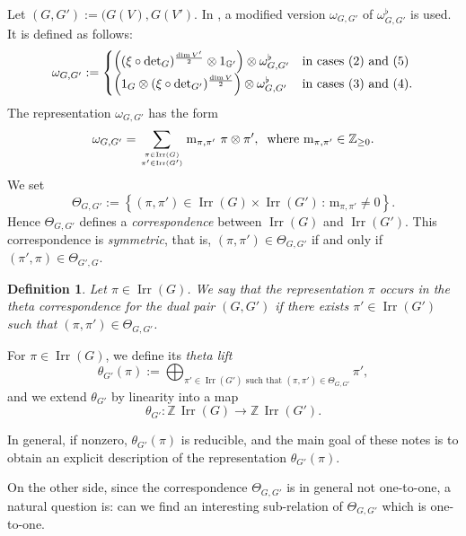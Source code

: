 \documentclass[12pt]{amsart}
\numberwithin{equation}{subsection}
\newtheorem{defn}[equation]{Definition}
\newcommand{\ZZ}{\mathbb{Z}}
\newcommand{\G}{\mathbb{G}}
\newcommand{\mult}{\mathrm{m}}
\newcommand{\Irr}{\operatorname{Irr}}
\begin{document}
Let $(G,G'):=(G(V),G(V')$. In \cite{MQZ}, a modified version $\omega_{G,G'}$ of $\omega_{G,G'}^\flat$ is used. It  is defined as follows:
\begin{equation} \label{eqn:omegaGGdef}
\omega_{G,G'}:=
\begin{cases}
\left((\xi\circ \det_{G})^{\frac{\dim V'}{2}}\otimes 1_{\G'}\right)\otimes\omega^\flat_{G,G'}&\text{in cases (2) and (5)}\cr
\left(1_{G}\otimes(\xi\circ \det_{G'})^{\frac{\dim V}{2}}\right)\otimes\omega^\flat_{G,G'}&\text{in cases (3) and (4)}.
\end{cases}
\end{equation}
The representation $\omega_{G,G'}$ has the form
\begin{equation} \label{eqn:omegaGG}
\omega_{G,G'}=\sum_{\pi\in\Irr(G)\atop\pi'\in\Irr(G')}\mult_{\pi,\pi'}\,\,\pi\otimes\pi',\;\;\text{where $\mult_{\pi,\pi'}\in \ZZ_{\ge 0}$}.
\end{equation}
We set
\begin{equation} \label{eqn:thetaGG}
\Theta_{G,G'}:=\left\{(\pi,\pi')\in\Irr(G)\times\Irr(G')\,:\,\mult_{\pi,\pi'}\ne 0\right\}.
\end{equation}
Hence $\Theta_{G,G'}$ defines a \textit{correspondence} between $\Irr(G)$ and $\Irr(G')$.  This correspondence is \textit{symmetric}, that is, $(\pi,\pi')\in\Theta_{G,G'}$ if and only if $(\pi',\pi)\in\Theta_{G',G}$.

\begin{defn} \label{defn:Theta} {\rm Let $\pi\in\Irr(G)$. We say that the representation \textit{$\pi$ occurs in the  theta correspondence for the dual pair $(G,G')$} if  there exists $\pi'\in\Irr(G')$ such that $(\pi,\pi')\in\Theta_{G,G'}$.}
\end{defn}


For $\pi\in\Irr(G)$, we  define its \textit{theta lift}
\begin{equation}\theta_{G'}(\pi):=\bigoplus_{\text{$\pi'\in\Irr(G')$ such that $(\pi,\pi')\in \Theta_{G,G'}$}}\pi',
\end{equation}
and we extend $\theta_{G'}$ by linearity into a map 
\begin{equation} \label{eqn:thetaG}
\theta_{G'}\colon \ZZ\,\Irr(G)\to \ZZ\,\Irr(G').
\end{equation}

In general, if nonzero, $\theta_{G'}(\pi)$ is reducible, and the main goal of these notes is to obtain an explicit description of the representation $\theta_{G'}(\pi)$.

On the other side, since the correspondence $\Theta_{G,G'}$ is in general not one-to-one, a natural question is: can we find an interesting sub-relation of $\Theta_{G,G'}$ which is one-to-one. 
\end{document}
